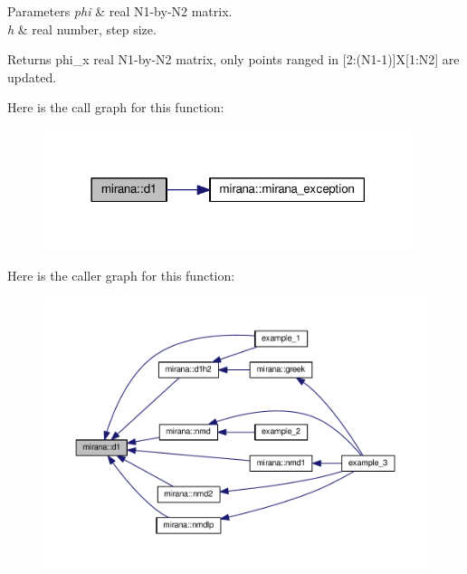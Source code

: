\begin{DoxyParams}{Parameters}
{\em phi} & real N1-\/by-\/\+N2 matrix. \\
\hline
{\em h} & real number, step size. \\
\hline
\end{DoxyParams}
\begin{DoxyReturn}{Returns}
phi\+\_\+x real N1-\/by-\/\+N2 matrix, only points ranged in \mbox{[}2\+:(N1-\/1)\mbox{]}X\mbox{[}1\+:N2\mbox{]} are updated. 
\end{DoxyReturn}


Here is the call graph for this function\+:\nopagebreak
\begin{figure}[H]
\begin{center}
\leavevmode
\includegraphics[width=306pt]{namespacemirana_a4009036e8b04ac992641e36d34ab0ed4_cgraph}
\end{center}
\end{figure}




Here is the caller graph for this function\+:\nopagebreak
\begin{figure}[H]
\begin{center}
\leavevmode
\includegraphics[width=350pt]{namespacemirana_a4009036e8b04ac992641e36d34ab0ed4_icgraph}
\end{center}
\end{figure}



